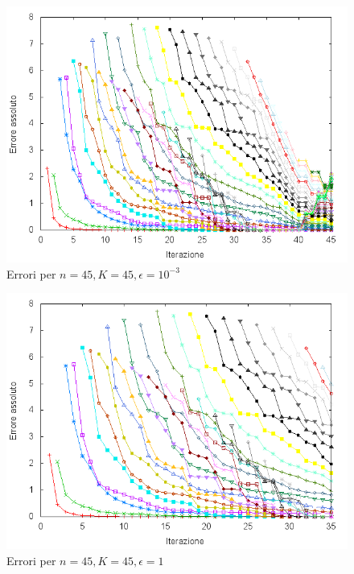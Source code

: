 \documentclass[11pt]{article}
\numberwithin{equation}{subsection}
\theoremstyle{connome}
\theoremstyle{connomesenzanumero}
\theoremstyle{connome+}
\theoremstyle{connomesenzanumero+}
\begin{document}
\begin{figure}[htb]
\centering
\includegraphics[width=.9\linewidth]{./img/errors_n45K45eps-3.png}
\caption{\label{epsilon_piccolo}Errori per $n=45, K=45, \epsilon=10^{-3}$}
\end{figure}

\begin{figure}[htb]
\centering
\includegraphics[width=.9\linewidth]{./img/errors_n45K45eps0.png}
\caption{\label{epsilon_grande}Errori per $n=45, K=45, \epsilon=1$}
\end{figure}
\end{document}
